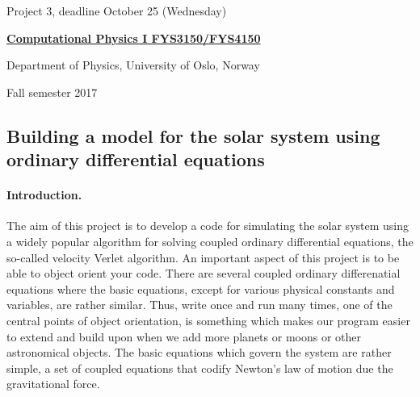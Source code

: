 \documentclass[%
oneside,                 %
final,                   %
10pt]{article}
\begin{document}

\newcommand{\exercisesection}[1]{\subsection*{#1}}






\thispagestyle{empty}

\begin{center}
{\LARGE\bf
\begin{spacing}{1.25}
Project 3, deadline  October 25 (Wednesday)
\end{spacing}
}
\end{center}


\begin{center}
{\bf \href{{http://www.uio.no/studier/emner/matnat/fys/FYS3150/index-eng.html}}{Computational Physics I FYS3150/FYS4150}}
\end{center}

    \begin{center}
\centerline{{\small Department of Physics, University of Oslo, Norway}}
\end{center}
    

\begin{center}
Fall semester 2017
\end{center}

\vspace{1cm}


\subsection*{Building a model for the solar system using ordinary differential equations}

\paragraph{Introduction.}
The aim of this project is to develop a code for simulating the solar system using a widely popular algorithm for solving coupled ordinary differential equations, the so-called velocity Verlet
algorithm. An important aspect of this project is to be able to object orient your code. There are several coupled ordinary differenatial equations where the basic equations, except for various physical constants and variables, are rather similar. Thus, write once and run many times, one of the central points of object orientation, is something which makes our program easier to extend and build upon  when we add more planets or moons or other astronomical objects. The basic equations which govern the system are rather simple, a set of coupled equations that codify Newton's law of motion due  the gravitational force.   
\end{document}
